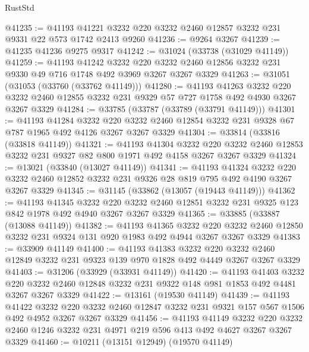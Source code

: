 \begin{lexlean}{RustStd}
\begin{coremodule}
@41235 := @41193 @41221 @3232 @220 @3232 @2460 @12857 @3232 @231 @9331 @22 @573 @1742 @2413 @9260
@41236 := @9264 @3267
@41239 := @41235 @41236 @9275 @9317
@41242 := @31024 (@33738 (@31029 @41149))
@41259 := @41193
    @41242
    @3232
    @220
    @3232
    @2460
    @12856
    @3232
    @231
    @9330
    @49
    @716
    @1748
    @492
    @3969
    @3267
    @3267
    @3329
@41263 := @31051 (@31053 (@33760 (@33762 @41149)))
@41280 := @41193
    @41263
    @3232
    @220
    @3232
    @2460
    @12855
    @3232
    @231
    @9329
    @57
    @727
    @1758
    @492
    @4930
    @3267
    @3267
    @3329
@41284 := @33785 (@33787 (@33789 (@33791 @41149)))
@41301 := @41193
    @41284
    @3232
    @220
    @3232
    @2460
    @12854
    @3232
    @231
    @9328
    @67
    @787
    @1965
    @492
    @4126
    @3267
    @3267
    @3329
@41304 := @33814 (@33816 (@33818 @41149))
@41321 := @41193
    @41304
    @3232
    @220
    @3232
    @2460
    @12853
    @3232
    @231
    @9327
    @82
    @800
    @1971
    @492
    @4158
    @3267
    @3267
    @3329
@41324 := @13021 (@33840 (@13027 @41149))
@41341 := @41193
    @41324
    @3232
    @220
    @3232
    @2460
    @12852
    @3232
    @231
    @9326
    @28
    @819
    @795
    @492
    @4190
    @3267
    @3267
    @3329
@41345 := @31145 (@33862 (@13057 (@19443 @41149)))
@41362 := @41193
    @41345
    @3232
    @220
    @3232
    @2460
    @12851
    @3232
    @231
    @9325
    @123
    @842
    @1978
    @492
    @4940
    @3267
    @3267
    @3329
@41365 := @33885 (@33887 (@13088 @41149))
@41382 := @41193
    @41365
    @3232
    @220
    @3232
    @2460
    @12850
    @3232
    @231
    @9324
    @131
    @920
    @1983
    @492
    @4944
    @3267
    @3267
    @3329
@41383 := @33909 @41149
@41400 := @41193
    @41383
    @3232
    @220
    @3232
    @2460
    @12849
    @3232
    @231
    @9323
    @139
    @970
    @1828
    @492
    @4449
    @3267
    @3267
    @3329
@41403 := @31206 (@33929 (@33931 @41149))
@41420 := @41193
    @41403
    @3232
    @220
    @3232
    @2460
    @12848
    @3232
    @231
    @9322
    @148
    @981
    @1853
    @492
    @4481
    @3267
    @3267
    @3329
@41422 := @13161 (@19530 @41149)
@41439 := @41193
    @41422
    @3232
    @220
    @3232
    @2460
    @12847
    @3232
    @231
    @9321
    @157
    @567
    @1506
    @492
    @4952
    @3267
    @3267
    @3329
@41456 := @41193
    @41149
    @3232
    @220
    @3232
    @2460
    @1246
    @3232
    @231
    @4971
    @219
    @596
    @413
    @492
    @4627
    @3267
    @3267
    @3329
@41460 := @10211 (@13151 @12949) (@19570 @41149)

\end{coremodule}
\end{lexlean}
